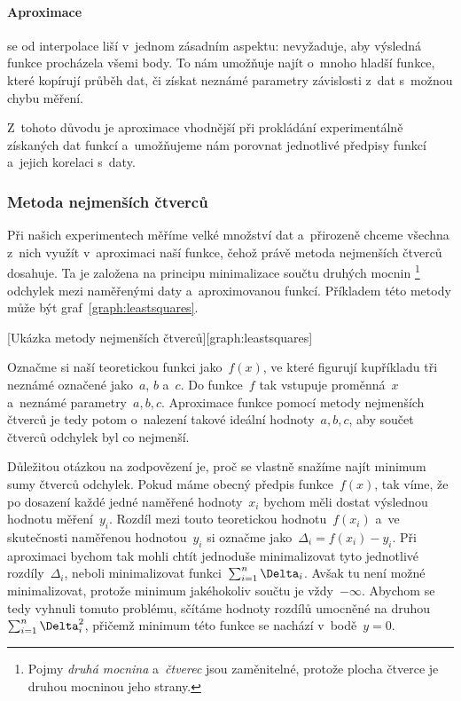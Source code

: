 \paragraph{Aproximace} se od interpolace liší v~jednom zásadním aspektu:
nevyžaduje, aby výsledná funkce procházela všemi body. To nám umožňuje najít
o~mnoho hladší funkce, které kopírují průběh dat, či získat neznámé parametry
závislosti z~dat s~možnou chybu měření. 

Z~tohoto důvodu je aproximace vhodnější při prokládání experimentálně získaných
dat funkcí a~umožňujeme nám porovnat jednotlivé předpisy funkcí a~jejich
korelaci s~daty.

\subsubsection{Metoda nejmenších čtverců}
\label{sec:čtverce}
Při našich experimentech měříme velké množství dat a~přirozeně chceme všechna
z~nich využít v~aproximaci naší funkce, čehož právě metoda nejmenších čtverců
dosahuje. Ta je založena na principu minimalizace součtu druhých mocnin%
\footnote{Pojmy \emph{druhá mocnina} a~\emph{čtverec} jsou zaměnitelné, protože
plocha čtverce je druhou mocninou jeho strany.} odchylek mezi naměřenými daty
a~aproximovanou funkcí. Příkladem této metody může být
graf~\ref{graph:leastsquares}.

[Ukázka metody nejmenších čtverců][graph:leastsquares]

Označme si naší teoretickou funkci  jako~$f(x)$, ve které figurují kupříkladu
tři neznámé označené  jako~$a$, $b$ a~$c$. Do funkce~$f$ tak vstupuje
proměnná~$x$ a~neznámé parametry~$a,b,c$. Aproximace funkce pomocí metody
nejmenších čtverců je tedy potom o~nalezení takové ideální  hodnoty~$a,b,c$,
aby součet čtverců odchylek byl co nejmenší.

Důležitou otázkou na zodpovězení je, proč se vlastně snažíme najít minimum sumy
čtverců odchylek. Pokud máme obecný předpis funkce~$f(x)$, tak víme, že po
dosazení každé jedné naměřené hodnoty~$x_i$ bychom měli dostat výslednou
hodnotu měření~$y_i$. Rozdíl mezi touto teoretickou hodnotu~$f(x_i)$ a~ve
skutečnosti naměřenou hodnotou~$y_i$ si označme jako~$\Delta_i = f(x_i)-y_i$.
Při aproximaci bychom tak mohli chtít jednoduše minimalizovat tyto jednotlivé
rozdíly~$\Delta_i$, neboli minimalizovat funkci~$\nsum \Delta_i$. Avšak tu není
možné minimalizovat, protože minimum jakéhokoliv součtu   je vždy~$-\infty$.
Abychom se tedy vyhnuli tomuto problému, sčítáme hodnoty rozdílů umocněné na
druhou~$\nsum \Delta_i^2$, přičemž minimum této funkce se nachází
v~bodě~$y=0$.~\cite{praktikum}

